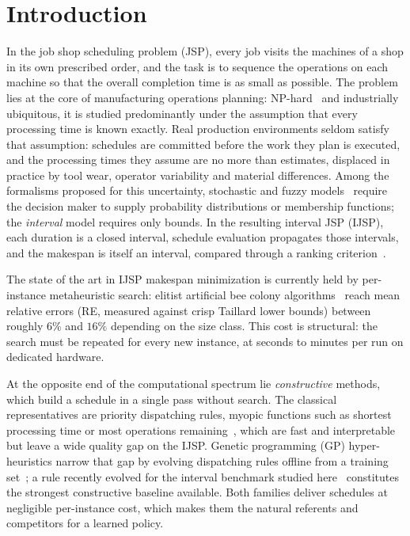 \documentclass[preprint,12pt]{elsarticle}
\theoremstyle{definition}
\theoremstyle{remark}
\begin{document}
\section{Introduction}
\label{sec:intro}

In the job shop scheduling problem (JSP), every job visits the
machines of a shop in its own prescribed order, and the task is to
sequence the operations on each machine so that the overall
completion time is as small as possible. The
problem lies at the core of manufacturing operations planning:
NP-hard~\citep{GareyJohnson1976}
and industrially ubiquitous, it is studied predominantly under the
assumption that every processing time is known exactly. Real
production environments seldom satisfy that assumption: schedules are
committed before the work they plan is executed, and the processing
times they assume are no more than estimates, displaced in practice
by tool wear, operator variability and material differences. Among
the formalisms proposed for this uncertainty, stochastic and fuzzy
models~\citep{GonzalezRodriguez2010} require the decision maker to
supply probability distributions or membership functions; the
\emph{interval} model requires only bounds. In the resulting
interval JSP (IJSP), each duration is a closed interval, schedule
evaluation propagates those intervals, and the makespan is itself an
interval, compared through a ranking criterion~\citep{Lei2011,
DiazICAE2023}.

The state of the art in IJSP makespan minimization is currently
held by per-instance metaheuristic search: elitist artificial bee colony
algorithms~\citep{DiazFEABC2023,DiazICAE2023} reach mean relative
errors (RE, measured against crisp Taillard lower bounds) between
roughly $6\%$ and $16\%$ depending on the size class. This cost is structural: the search must
be repeated for every new instance, at seconds to minutes per run on
dedicated hardware.

At the opposite end of the computational spectrum lie
\emph{constructive} methods, which build a schedule in a single pass
without search. The classical representatives are priority dispatching
rules, myopic functions such as shortest processing time or most
operations remaining~\citep{Panwalkar1977,Haupt1989}, which are fast
and interpretable but leave a wide quality gap on the IJSP. Genetic
programming (GP) hyper-heuristics narrow that gap by evolving
dispatching rules offline from a training
set~\citep{Branke2016,Nguyen2017}; a rule recently evolved for the
interval benchmark studied here~\citep{DiazGP2026} constitutes the
strongest constructive baseline available. Both families deliver
schedules at negligible per-instance cost, which makes them the
natural referents and competitors for a learned policy.
\end{document}
